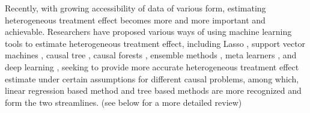 \documentclass[11pt,paper=letter]{scrartcl}
\newcommand\hz[1]{\textcolor{black}{#1}}
\begin{document}

Recently, with growing accessibility of data of various form, estimating heterogeneous treatment effect becomes more and more important and achievable. Researchers have proposed various ways of using machine learning tools to estimate heterogeneous treatment effect, including Lasso \cite{tian2014lasso,jeng2018debiaselasso}, support vector machines \cite{imai2013svm}, causal tree \cite{athey2015machine}, causal forests \cite{wager2017estimation}, ensemble methods \cite{grimmer2017ensemble}, meta learners \cite{hill2011bart,green2012bart,kunzel2017meta}, and deep learning \cite{shalit2016,kunzel2018transfer}, seeking to provide more accurate heterogeneous treatment effect estimate under certain assumptions for different causal problems, among which, linear regression based method and tree based methods are more recognized and form the two streamlines. (see below for a more detailed review)


\end{document}
